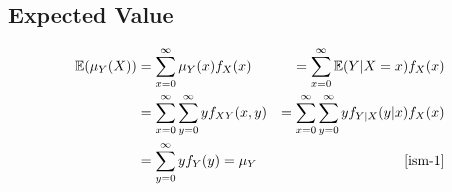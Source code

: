 \subsection{Expected Value \cite{ism-1,mfml-1}}
\begin{align*}
    \mathbb{E}(\mu_Y(X))
    &= \displaystyle\sum_{x=0}^{\infty} \mu_Y(x)f_X(x)
    &= \displaystyle\sum_{x=0}^{\infty} 
        \mathbb{E}(Y|X=x)f_X(x) \\
    &= \displaystyle\sum_{x=0}^{\infty}
        \displaystyle\sum_{y=0}^{\infty} yf_{XY}(x,y)
    &= \displaystyle\sum_{x=0}^{\infty}
        \displaystyle\sum_{y=0}^{\infty} yf_{Y|X}(y|x)f_X(x) \\
    &= \displaystyle\sum_{y=0}^{\infty} yf_Y(y) = \mu_Y
    & \text{\cite{ism-1}}
\end{align*}


